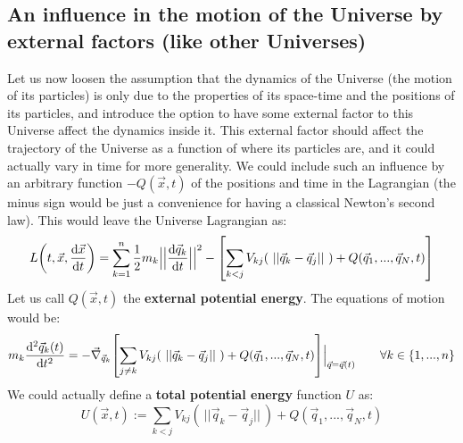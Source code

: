 \documentclass[11pt, a4paper]{article} %
\begin{document}

\subsection*{An influence in the motion of the Universe by external factors (like other Universes)}
Let us now loosen the assumption that the dynamics of the Universe (the motion of its particles) is only due to the properties of its space-time and the positions of its particles, and introduce the option to have some external factor to this Universe affect the dynamics inside it. This external factor should affect the trajectory of the Universe as a function of where its particles are, and it could actually vary in time for more generality. We could include such an influence by an arbitrary function $-Q(\vec{x},t)$ of the positions and time in the Lagrangian (the minus sign would be just a convenience for having a classical Newton's second law). This would leave the Universe Lagrangian as:
\begin{equation}\label{genLag}
L\qty(t, \vec{x}, \dv{\vec{x}}{t})=\sum_{k=1}^n\frac{1}{2} m_k\Big|\Big|\dv{\vec{q}_k}{t}\Big|\Big|^2-\qty[\sum_{k<j} V_{kj}(\ ||\vec{q}_k-\vec{q}_j||\ )+Q(\vec{q}_1,...,\vec{q}_N,t)]
\end{equation}
Let us call $Q(\vec{x},t)$ the {\bf external potential energy}. The equations of motion would be:
\begin{equation}\label{NewtOneUn}
m_k \dv[2]{\vec{q}_k(t)}{t} = -\vec{\nabla}_{\vec{q}_k}\qty[\sum_{j\neq k} V_{kj}\qty(\ ||\vec{q}_k-\vec{q}_j||\ )+ Q(\vec{q}_1,...,\vec{q}_N,t)]\Big\rvert_{\vec{q}=\vec{q}(t)}\quad\quad \forall k\in\{1,...,n\}
\end{equation}
We could actually define a {\bf total potential energy} function $U$ as:
\begin{equation}
U(\vec{x},t):=\sum_{k<j} V_{kj}(\ ||\vec{q}_k-\vec{q}_j||\ )+Q(\vec{q}_1,...,\vec{q}_N,t)
\end{equation}
\end{document}
